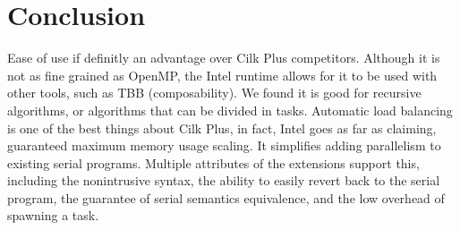 \documentclass[a4paper,10pt,openright,openbib,twocolumn]{article}
\begin{document}
\section{Conclusion} \label{conc}

Ease of use if definitly an advantage over Cilk Plus competitors. Although it is not as fine grained as OpenMP, the Intel runtime allows for it to be used with other tools, such as TBB (composability). We found it is good for recursive algorithms, or algorithms that can be divided in tasks. Automatic load balancing is one of the best things about Cilk Plus, in fact, Intel goes as far as claiming, guaranteed maximum memory usage scaling. It simplifies adding parallelism to existing serial programs. Multiple attributes of the extensions support this, including the nonintrusive syntax, the ability to easily revert back to the serial program, the guarantee of serial semantics equivalence, and the low overhead of spawning a task.
\end{document}
